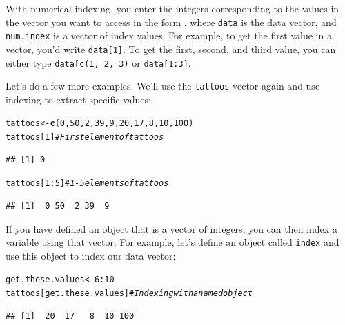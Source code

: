 \documentclass{tufte-book}\usepackage[]{graphicx}\usepackage[]{color}
\makeatletter
\newcommand{\hlnum}[1]{\textcolor[rgb]{0.686,0.059,0.569}{#1}}%
\newcommand{\hlcom}[1]{\textcolor[rgb]{0.678,0.584,0.686}{\textit{#1}}}%
\newcommand{\hlopt}[1]{\textcolor[rgb]{0,0,0}{#1}}%
\newcommand{\hlstd}[1]{\textcolor[rgb]{0.345,0.345,0.345}{#1}}%
\newcommand{\hlkwb}[1]{\textcolor[rgb]{0.69,0.353,0.396}{#1}}%
\newcommand{\hlkwd}[1]{\textcolor[rgb]{0.737,0.353,0.396}{\textbf{#1}}}%
\newenvironment{kframe}{%
 \def\at@end@of@kframe{}%
 \ifinner\ifhmode%
  \def\at@end@of@kframe{\end{minipage}}%
  \begin{minipage}{\columnwidth}%
 \fi\fi%
 \def\FrameCommand##1{\hskip\@totalleftmargin \hskip-\fboxsep
 \colorbox{shadecolor}{##1}\hskip-\fboxsep
     \hskip-\linewidth \hskip-\@totalleftmargin \hskip\columnwidth}%
 \MakeFramed {\advance\hsize-\width
   \@totalleftmargin\z@ \linewidth\hsize
   \@setminipage}}%
 {\par\unskip\endMakeFramed%
 \at@end@of@kframe}
\newenvironment{knitrout}{}{} %
\makeatother
\begin{document}
With numerical indexing, you enter the integers corresponding to the values in the vector you want to access in the form , where \texttt{data} is the data vector, and \texttt{num.index} is a vector of index values. For example, to get the first value in a vector, you'd write \texttt{data[1]}. To get the first, second, and third value, you can either type \texttt{data[c(1, 2, 3)} or \texttt{data[1:3]}.

Let's do a few more examples. We'll use the \texttt{tattoos} vector again and use indexing to extract specific values:
  
\begin{footnotesize}
\begin{knitrout}
\color{fgcolor}\begin{kframe}
\begin{alltt}
\hlstd{tattoos} \hlkwb{<-} \hlkwd{c}\hlstd{(}\hlnum{0}\hlstd{,} \hlnum{50}\hlstd{,} \hlnum{2}\hlstd{,} \hlnum{39}\hlstd{,} \hlnum{9}\hlstd{,} \hlnum{20}\hlstd{,} \hlnum{17}\hlstd{,} \hlnum{8}\hlstd{,} \hlnum{10}\hlstd{,} \hlnum{100}\hlstd{)}
\hlstd{tattoos[}\hlnum{1}\hlstd{]} \hlcom{# First element of tattoos}
\end{alltt}
\begin{verbatim}
## [1] 0
\end{verbatim}
\begin{alltt}
\hlstd{tattoos[}\hlnum{1}\hlopt{:}\hlnum{5}\hlstd{]} \hlcom{# 1-5 elements of tattoos}
\end{alltt}
\begin{verbatim}
## [1]  0 50  2 39  9
\end{verbatim}
\end{kframe}
\end{knitrout}

If you have defined an object that is a vector of integers, you can then index a variable using that vector. For example, let's define an object called \texttt{index} and use this object to index our data vector:
  
\begin{footnotesize}
\begin{knitrout}
\color{fgcolor}\begin{kframe}
\begin{alltt}
\hlstd{get.these.values} \hlkwb{<-} \hlnum{6}\hlopt{:}\hlnum{10}
\hlstd{tattoos[get.these.values]} \hlcom{# Indexing with a named object}
\end{alltt}
\begin{verbatim}
## [1]  20  17   8  10 100
\end{verbatim}
\end{kframe}
\end{knitrout}
\end{footnotesize}


\end{footnotesize}
\end{document}
